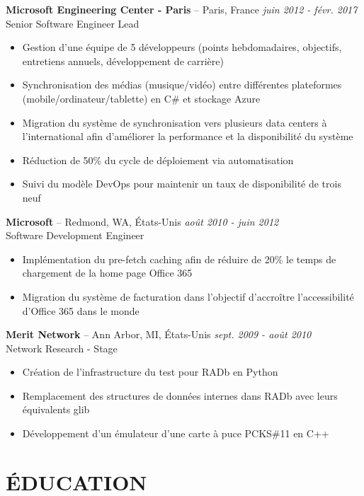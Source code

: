 \documentclass[]{rob-keim-resume}
\begin{document}
	{\bf Microsoft Engineering Center - Paris} --  Paris, France \hfill {\sl juin 2012 - févr. 2017} \\
	Senior Software Engineer Lead
	\begin{itemize} \itemsep -2pt
		\item Gestion d'une équipe de 5 développeurs (points hebdomadaires, objectifs, entretiens annuels, développement de carrière) 
		\item Synchronisation des médias (musique/vidéo) entre différentes plateformes (mobile/ordinateur/tablette) en C\# et stockage Azure
		\item Migration du système de synchronisation vers plusieurs data centers à l’international afin d’améliorer la performance et la disponibilité du système
		\item Réduction de 50\% du cycle de déploiement via automatisation
		\item Suivi du modèle DevOps pour maintenir un taux de disponibilité de trois neuf
	\end{itemize}
	
	{\bf Microsoft} --  Redmond, WA, États-Unis \hfill {\sl août 2010 - juin 2012} \\
	Software Development Engineer
	\begin{itemize} \itemsep -2pt
		\item Implémentation du pre-fetch caching afin de réduire de 20\% le temps de chargement de la home page Office 365
		\item Migration du système de facturation dans l’objectif d’accroître l’accessibilité d’Office 365 dans le monde
	\end{itemize}
	
	{\bf Merit Network} --  Ann Arbor, MI, États-Unis \hfill {\sl sept. 2009 - août 2010} \\
	Network Research - Stage
	\begin{itemize} \itemsep -2pt
		\item Création de l’infrastructure du test pour RADb en Python
		\item Remplacement des structures de données internes dans RADb avec leurs équivalents glib
		\item Développement d’un émulateur d’une carte à puce PCKS\#11 en C++
	\end{itemize}
	
	\section{ÉDUCATION} 
	
\end{document}
